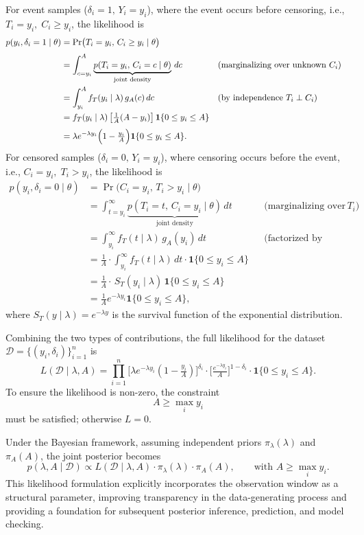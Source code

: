 For event samples ($\delta_i=1,\, Y_i=y_i$), where the event occurs before censoring, i.e., $T_i = y_i,\; C_i \ge y_i$, the likelihood is
\begin{align}
p(y_i,\delta_i=1\mid\theta)
 &= \Pr\bigl(T_i=y_i,\,C_i\ge y_i \mid \theta\bigr) \\[3pt]
 &= \int_{c=y_i}^{A} \underbrace{p(T_i=y_i,\,C_i=c \mid \theta)}_{\text{joint density}}\,dc 
    &&\text{(marginalizing over unknown }C_i)\\[0pt]
 &= \int_{y_i}^{A} f_T(y_i\mid\lambda)\,g_A(c)\,dc 
    &&\text{(by independence }T_i\perp C_i)\\[0pt]
 &= f_T(y_i\mid\lambda)\,
    \bigl[\tfrac1A(A-y_i)\bigr]\,
    \mathbf 1\{0\le y_i\le A\}\\[3pt]
 &= \lambda e^{-\lambda y_i}\Bigl(1-\tfrac{y_i}{A}\Bigr)
    \mathbf 1\{0\le y_i\le A\}.
\end{align}
For censored samples ($\delta_i=0,\, Y_i=y_i$), where censoring occurs before the event, i.e., $C_i = y_i,\; T_i > y_i$, the likelihood is
\begin{align}
p(y_i,\delta_i=0\mid\theta)
 &= \Pr\bigl(C_i=y_i,\,T_i>y_i \mid \theta\bigr) \\[0pt]
 &= \int_{t=y_i}^{\infty} 
    \underbrace{p(T_i=t,\,C_i=y_i \mid \theta)}_{\text{joint density}}\,dt
    &&\text{(marginalizing over unknown }T_i)\\[0pt]
 &= \int_{y_i}^{\infty} f_T(t\mid\lambda)\,g_A(y_i)\,dt
    &&\text{(factorized by independence)}\\[0pt]
 &= \frac{1}{A} \cdot \int_{y_i}^{\infty} f_T(t \mid \lambda) \, dt \cdot \mathbf{1}\{0 \le y_i \le A\} \\
 &= \frac{1}{A}\cdot \,S_T(y_i\mid\lambda)\,
    \mathbf 1\{0\le y_i\le A\}\\[3pt]
 &= \tfrac1A e^{-\lambda y_i}\mathbf 1\{0\le y_i\le A\},
\end{align}
where $S_T(y\mid\lambda)=e^{-\lambda y}$ is the survival function of the exponential distribution.

Combining the two types of contributions, the full likelihood for the dataset $\mathcal{D} = \{(y_i, \delta_i)\}_{i=1}^n$ is
\begin{equation}
L(\mathcal{D}\mid\lambda,A)=
\prod_{i=1}^n
\bigl[\lambda e^{-\lambda y_i}(1-\tfrac{y_i}{A})\bigr]^{\delta_i}
\cdot \bigl[\tfrac{e^{-\lambda y_i}}{A}\bigr]^{1-\delta_i}
\cdot \mathbf 1\{0\le y_i \le A\}.
\end{equation}
To ensure the likelihood is non-zero, the constraint
$$
A \ge \max_i y_i
$$
must be satisfied; otherwise $L=0$.

Under the Bayesian framework, assuming independent priors $\pi_\lambda(\lambda)$ and $\pi_A(A)$, the joint posterior becomes
\begin{equation}
p(\lambda, A \mid \mathcal{D}) \propto 
L(\mathcal{D} \mid \lambda, A)\cdot
\pi_\lambda(\lambda)\cdot
\pi_A(A),
\qquad \text{with } A \ge \max_i y_i.
\end{equation}
This likelihood formulation explicitly incorporates the observation window as a structural parameter, improving transparency in the data-generating process and providing a foundation for subsequent posterior inference, prediction, and model checking.
